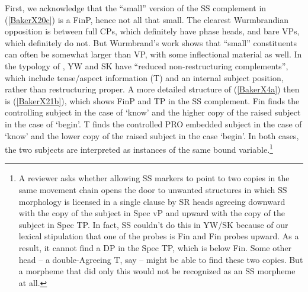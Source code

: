 \documentclass[output=paper]{langscibook}
\begin{document}
First, we acknowledge that the “small” version of the SS complement in (\ref{BakerX20c}) is a FinP, hence not all that small. The clearest Wurmbrandian opposition is between full CPs, which definitely have phase heads, and bare VPs, which definitely do not. But Wurmbrand’s work shows that “small” constituents can often be somewhat larger than VP, with some inflectional material as well. In the typology of \citet{wurmbrand2001infinitives}, YW and SK have “reduced non-restructuring complements”, which include tense/aspect information (T) and an internal subject position, rather than restructuring proper. A more detailed structure of (\ref{BakerX4a}) then is (\ref{BakerX21b}), which shows FinP and TP in the SS complement. Fin finds the controlling subject in the case of `know’ and the higher copy of the raised subject in the case of `begin’. T finds the controlled PRO embedded subject in the case of `know’ and the lower copy of the raised subject in the case `begin’. In both cases, the two subjects are interpreted as instances of the same bound variable.{\footnote{A reviewer asks whether allowing SS markers to point to two copies in the same movement chain opens the door to unwanted structures in which SS morphology is licensed in a single clause by SR heads agreeing downward with the copy of the subject in Spec vP and upward with the copy of the subject in Spec TP. In fact, SS couldn’t do this in YW/SK because of our lexical stipulation that one of the probes is Fin and Fin probes upward. As a result, it cannot find a DP in the Spec TP, which is below Fin. Some other head  –  a double-Agreeing T, say  –  might be able to find these two copies. But a morpheme that did only this would not be recognized as an SS morpheme at all.}}
\end{document}
